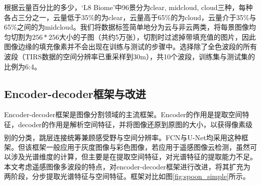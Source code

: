 \documentclass[10pt,UTF8,fntef]{ctexart}
\newcommand{\upcite}[1]{\textsuperscript{\textsuperscript{\cite{#1}}}}
\begin{document}
\begin{multicols}{2}
\begin{table}[H]
    \centering
    
    \label{BiomeFlag}
    \end{table}

根据云量百分比的多少，‘L8 Biome’中96景分为clear, midcloud, cloud三种，每种各占三分之一，云量低于35\%的为clear，云量高于65\%的为cloud，云量介于35\%与65\%之间的为midcloud。我们将数据标签简单地分为云与非云两类，将每景图像均匀切割为$256*256$大小的子图（共约5万张），切割时过滤掉带填充值的图片，因此图像边缘的填充像素并不会出现在训练与测试的步骤中。选择除了全色波段的所有波段（TIRS数据的空间分辨率已重采样到30m），共10个波段，训练集与测试集的比例为6:4。

\subsection{Encoder-decoder框架与改进}
Encoder-decoder框架是图像分割领域的主流框架。Encoder的作用是提取空间特征，decoder的作用是解析空间特征，并将图像还原到原图的大小，以获得像素级别的分类，跳层连接统筹兼顾感受野与空间分辨率。FCN\upcite{FCN}与U-Net\upcite{ronneberger2015unet}均采用这种框架。但该框架一般应用于灰度图像与彩色图像，若应用于遥感图像云检测，虽然可以涉及光谱维度的计算，但主要是在提取空间特征，对光谱特征的提取能力不足。
本文考虑遥感图像多波段的特点，对encoder-decoder框架进行改进，将其扩充为两阶段，分步提取光谱特征与空间特征。框架对比如图\ref{fig:spoon_simple}所示。


\end{multicols}
\end{document}
